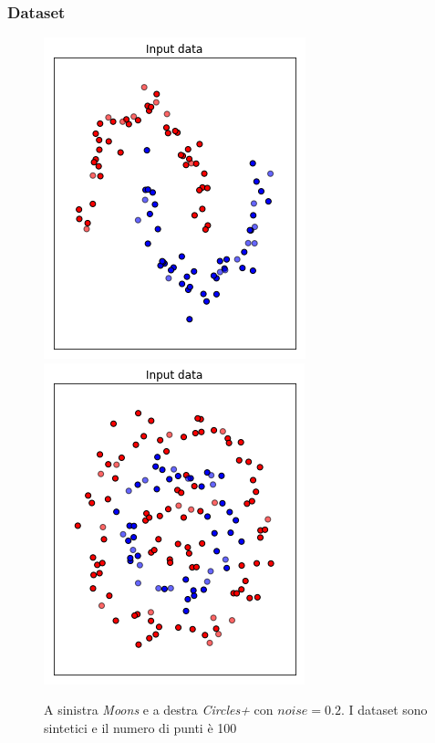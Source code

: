 \documentclass{beamer}
\begin{document}
\begin{frame}
 \frametitle{Dataset}
 \begin{figure}
  \centering
  \includegraphics[scale = 0.5]{images/moons_noise.png}
  \includegraphics[scale = 0.5]{images/circles+_noise.png}
  \caption{\large A sinistra \textit{Moons} e a destra \textit{Circles+} con $noise = 0.2$.
  I dataset sono sintetici e il numero di punti è 100}
 \end{figure}

\end{frame}
\end{document}
